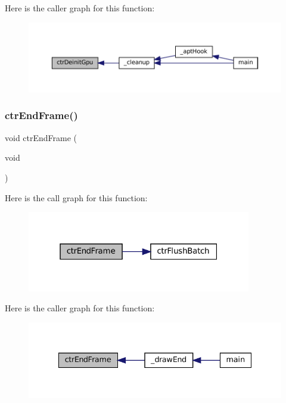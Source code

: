 Here is the caller graph for this function\+:
\nopagebreak
\begin{figure}[H]
\begin{center}
\leavevmode
\includegraphics[width=350pt]{ctr-gpu_8h_a351de94984c7d5ffca8dd11c840f0da1_icgraph}
\end{center}
\end{figure}
\mbox{\label{ctr-gpu_8h_afde5ab22c1fe022b58bee18e06dfa89e}} 
\subsubsection{\texorpdfstring{ctr\+End\+Frame()}{ctrEndFrame()}}
{\footnotesize\ttfamily void ctr\+End\+Frame (\begin{DoxyParamCaption}\item[{void}]{ }\end{DoxyParamCaption})}

Here is the call graph for this function\+:
\nopagebreak
\begin{figure}[H]
\begin{center}
\leavevmode
\includegraphics[width=277pt]{ctr-gpu_8h_afde5ab22c1fe022b58bee18e06dfa89e_cgraph}
\end{center}
\end{figure}
Here is the caller graph for this function\+:
\nopagebreak
\begin{figure}[H]
\begin{center}
\leavevmode
\includegraphics[width=335pt]{ctr-gpu_8h_afde5ab22c1fe022b58bee18e06dfa89e_icgraph}
\end{center}
\end{figure}
\mbox{\label{ctr-gpu_8h_a7ab09886a00743bfac1d2b4aee447a34}} 
